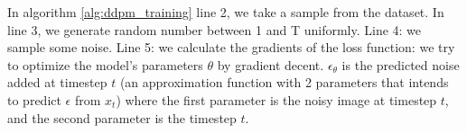 In algorithm \ref{alg:ddpm_training} line 2, we take a sample from the dataset. In line 3, we generate random number between 1 and T uniformly. Line 4: we sample some noise. Line 5: we calculate the gradients of the loss function: we try to optimize the model's parameters $\theta$ by gradient decent. $\epsilon_\theta$ is the predicted noise added at timestep $t$ (an approximation function with 2 parameters that intends to predict $\epsilon$ from $x_t$) where the first parameter is the noisy image at timestep $t$, and the second parameter is the timestep $t$.



